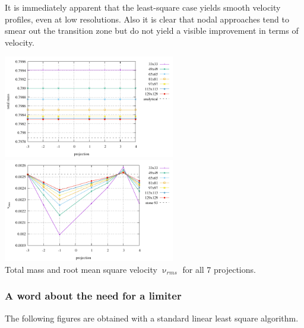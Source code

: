 It is immediately apparent that the least-square case yields smooth velocity profiles, even at 
low resolutions. Also it is clear that nodal approaches tend to smear out the transition zone
but do not yield a visible improvement in terms of velocity.

\begin{center}
\includegraphics[width=7.5cm]{python_codes/fieldstone_41/results/exp3/mass.pdf}
\includegraphics[width=7.5cm]{python_codes/fieldstone_41/results/exp3/vrms.pdf}\\
{\captionfont Total mass and root mean square velocity $\upnu_{rms}$ for all 7 projections.}
\end{center}

\subsubsection*{A word about the need for a limiter}

The following figures are obtained with a standard linear least square algorithm. 

